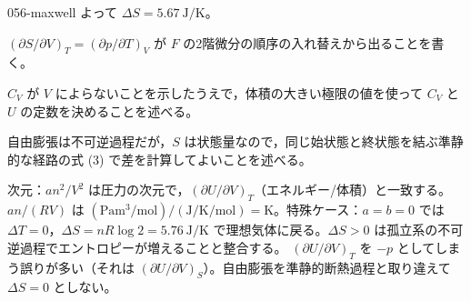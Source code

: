 \documentclass[uplatex,dvipdfmx,a4paper,11pt]{jsarticle}
\begin{document}
\begin{kaisetsu}{056-maxwell}
よって $\Delta S=\qty{5.67}{\joule\per\kelvin}$。
\begin{ronten}
  \item {} $(\partial S/\partial V)_{T}=(\partial p/\partial T)_{V}$ が $F$ の2階微分の順序の入れ替えから出ることを書く。
  \item {} $C_{V}$ が $V$ によらないことを示したうえで，体積の大きい極限の値を使って $C_{V}$ と $U$ の定数を決めることを述べる。
  \item {} 自由膨張は不可逆過程だが，$S$ は状態量なので，同じ始状態と終状態を結ぶ準静的な経路の式 (3) で差を計算してよいことを述べる。
\end{ronten}
\kenzan 次元：$an^{2}/V^{2}$ は圧力の次元で，$(\partial U/\partial V)_{T}$（エネルギー/体積）と一致する。$an/(RV)$ は $(\unit{\pascal\cubic\metre\per\mole})/(\unit{\joule\per\kelvin\per\mole})=\unit{\kelvin}$。特殊ケース：$a=b=0$ では $\Delta T=0$，$\Delta S=nR\log2=\qty{5.76}{\joule\per\kelvin}$ で理想気体に戻る。$\Delta S>0$ は孤立系の不可逆過程でエントロピーが増えることと整合する。
\tsumazuki $(\partial U/\partial V)_{T}$ を $-p$ としてしまう誤りが多い（それは $(\partial U/\partial V)_{S}$）。自由膨張を準静的断熱過程と取り違えて $\Delta S=0$ としない。
\end{kaisetsu}
\end{document}
